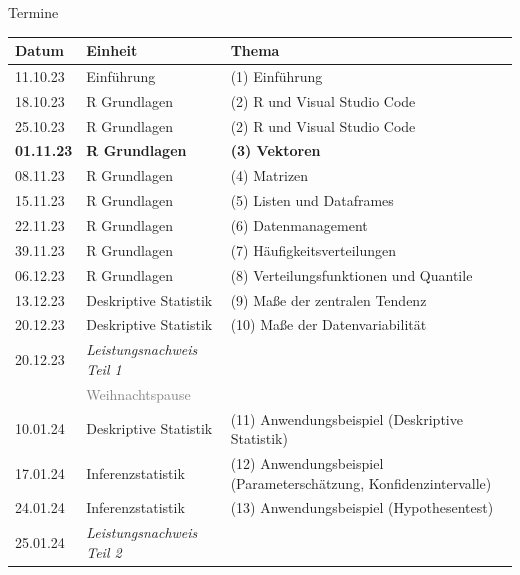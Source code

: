 \documentclass[
  8pt,
  ignorenonframetext,
]{beamer}
\begin{document}
\begin{frame}[plain]{Termine}
\protect\hypertarget{termine}{}
\vfill
\center
\footnotesize

\renewcommand{\arraystretch}{1.1}
\begin{tabular}{lll}
Datum          & Einheit               & Thema                                  \\\hline
11.10.23       & Einführung            & (1) Einführung \\
18.10.23       & R Grundlagen          & (2) R und Visual Studio Code           \\
25.10.23       & R Grundlagen          & (2) R und Visual Studio Code           \\
\textbf{01.11.23}       & \textbf{R Grundlagen}          & \textbf{(3) Vektoren}\\
08.11.23       & R Grundlagen          & (4) Matrizen                           \\
15.11.23       & R Grundlagen          & (5) Listen und Dataframes              \\
22.11.23       & R Grundlagen          & (6) Datenmanagement                    \\
39.11.23       & R Grundlagen          & (7) Häufigkeitsverteilungen            \\
06.12.23       & R Grundlagen          & (8) Verteilungsfunktionen und Quantile \\
13.12.23       & Deskriptive Statistik & (9) Maße der zentralen Tendenz         \\
20.12.23       & Deskriptive Statistik & (10) Maße der Datenvariabilität        \\
20.12.23       & \textit{Leistungsnachweis Teil 1}        \\
               & \textcolor{gray}{Weihnachtspause}                              \\
10.01.24       & Deskriptive Statistik & (11) Anwendungsbeispiel (Deskriptive Statistik)                   \\
17.01.24       & Inferenzstatistik     & (12) Anwendungsbeispiel (Parameterschätzung, Konfidenzintervalle) \\
24.01.24       & Inferenzstatistik     & (13) Anwendungsbeispiel (Hypothesentest)                          \\
25.01.24       & \textit{Leistungsnachweis Teil 2}                          \\\hline
\end{tabular}
\end{frame}
\end{document}

